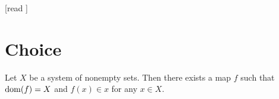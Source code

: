 \documentclass[10pt]{article}
\begin{document}
  \begin{imports}
    \begin{forthel}
      [read ]
    \end{forthel}
  \end{imports}


  \section{Choice}

  \begin{forthel}
    \begin{axiom}[title=Axiom of Choice,id=FOUNDATIONS_10_1897613305577472,printid]
      Let $X$ be a system of nonempty sets.
      Then there exists a map $f$ such that $\operatorname{dom}(f) = X$ and $f(x) \in x$ for any $x \in X$.
    \end{axiom}
  \end{forthel}
\end{document}
